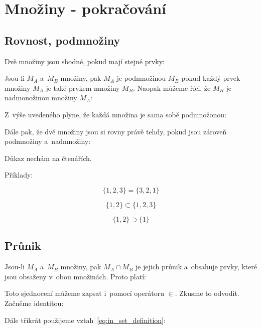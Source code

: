 \section{Množiny - pokračování}

\subsection{Rovnost, podmnožiny}
Dvě množiny jsou shodné, pokud mají stejné prvky:


Jsou-li \(M_A\) a~\(M_B\) množiny, pak \(M_A\) je podmnožinou \(M_B\) pokud každý prvek množiny \(M_A\) je také prvkem množiny \(M_B\). Naopak můžeme říci, že \(M_B\) je nadmonožinou množiny \(M_A\):


Z~výše uvedeného plyne, že každá množina je sama sobě podmnožonou:


Dále pak, že dvě množiny jsou si rovny právě tehdy, pokud jsou zároveň podmnožiny a~nadmnožiny:


Důkaz nechám na čtenářích.

Příklady:

\begin{equation}
\{1, 2, 3\} = \{3, 2, 1\}
\end{equation}

\begin{equation}
\{1, 2\} \subset \{1, 2, 3\}
\end{equation}

\begin{equation}
\{1, 2\} \supset \{1\}
\end{equation}

\subsection{Průnik}
Jsou-li \(M_A\) a~\(M_B\) množiny, pak \(M_A \cap M_B\) je jejich průnik a~obsahuje prvky, které jsou obsaženy v~obou množinách. Proto platí:


Toto sjednocení můžeme zapsat i~pomocí operátoru \(\in\). Zkusme to odvodit. Začněme identitou:

Dále třikrát použijeme vztah~\eqref{eq:in_set_definition}:

